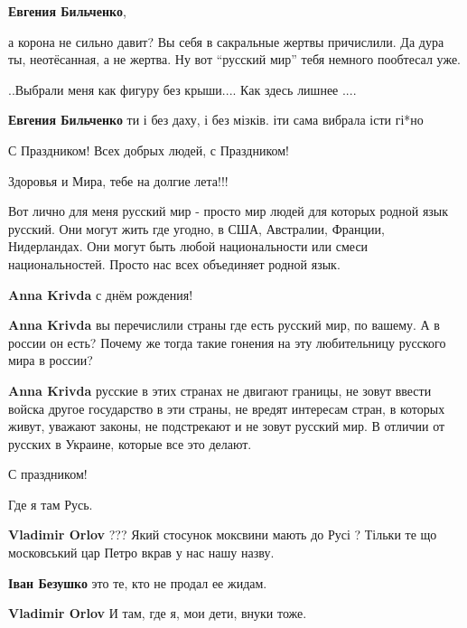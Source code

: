 \begin{itemize}
\begin{itemize}
\textbf{Евгения Бильченко}, 

а корона не сильно давит? Вы себя в сакральные жертвы причислили. Да дура ты,
неотёсанная, а не жертва. Ну вот \enquote{русский мир} тебя немного пообтесал уже.

..Выбрали меня как фигуру без крыши.... Как здесь лишнее ....

\textbf{Евгения Бильченко} ти і без даху, і без мізків. іти сама вибрала істи гі*но
\end{itemize} %

С Праздником! Всех добрых людей, с Праздником!

Здоровья и Мира, тебе на долгие лета!!!


Вот лично для меня русский мир - просто мир людей для которых родной язык
русский. Они могут жить где угодно, в США, Австралии, Франции, Нидерландах. Они
могут быть любой национальности или смеси национальностей. Просто нас всех
объединяет родной язык.

\begin{itemize} %
\textbf{Anna Krivda} с днём рождения!

\textbf{Anna Krivda} вы перечислили страны где есть русский мир, по вашему.
А в россии он есть?
Почему же тогда такие гонения на эту любительницу русского мира в россии?

\textbf{Anna Krivda} русские в этих странах не двигают границы, не зовут ввести войска другое государство в эти страны, не вредят интересам стран, в которых живут, уважают законы, не подстрекают и не зовут русский мир. В отличии от русских в Украине, которые все это делают.
\end{itemize} %

С праздником!

Где я там Русь.

\begin{itemize} %
\textbf{Vladimir Orlov} ??? Який стосунок моксвини мають до Русі ? Тільки те що московський цар Петро вкрав у нас нашу назву.

\textbf{Іван Безушко} это те, кто не продал ее жидам.

\textbf{Vladimir Orlov}
И там, где я, мои дети, внуки тоже.


\end{itemize}
\end{itemize}
